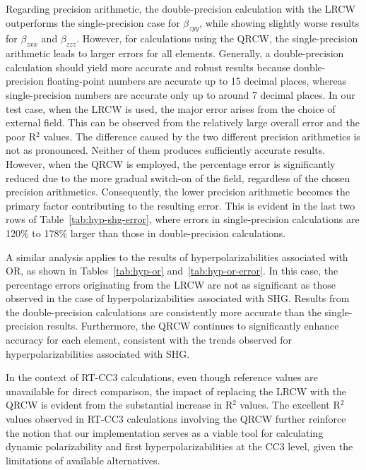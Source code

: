 Regarding precision arithmetic, the double-precision calculation with the LRCW outperforms the single-precision case for $\beta_{zyy}$, while showing slightly worse results for $\beta_{zxx}$ and $\beta_{zzz}$. However, for calculations using the QRCW, the single-precision arithmetic leads to larger errors for all elements. Generally, a double-precision calculation should yield more accurate and robust results because double-precision floating-point numbers are accurate up to 15 decimal places, whereas single-precision numbers are accurate only up to around 7 decimal places. In our test case, when the LRCW is used, the major error arises from the choice of external field. This can be observed from the relatively large overall error and the poor R$^{2}$ values. The difference caused by the two different precision arithmetics is not as pronounced. Neither of them produces sufficiently accurate results. However, when the QRCW is employed, the percentage error is significantly reduced due to the more gradual switch-on of the field, regardless of the chosen precision arithmetics. Consequently, the lower precision arithmetic becomes the primary factor contributing to the resulting error. This is evident in the last two rows of Table~\ref{tab:hyp-shg-error}, where errors in single-precision calculations are 120\% to 178\% larger than those in double-precision calculations.

A similar analysis applies to the results of hyperpolarizabilities associated with OR, as shown in Tables~\ref{tab:hyp-or} and~\ref{tab:hyp-or-error}. In this case, the percentage errors originating from the LRCW are not as significant as those observed in the case of hyperpolarizabilities associated with SHG. Results from the double-precision calculations are consistently more accurate than the single-precision results. Furthermore, the QRCW continues to significantly enhance accuracy for each element, consistent with the trends observed for hyperpolarizabilities associated with SHG.

In the context of RT-CC3 calculations, even though reference values are unavailable for direct comparison, the impact of replacing the LRCW with the QRCW is evident from the substantial increase in R$^{2}$ values. The excellent R$^{2}$ values observed in RT-CC3 calculations involving the QRCW further reinforce the notion that our implementation serves as a viable tool for calculating dynamic polarizability and first hyperpolarizabilities at the CC3 level, given the limitations of available alternatives.

